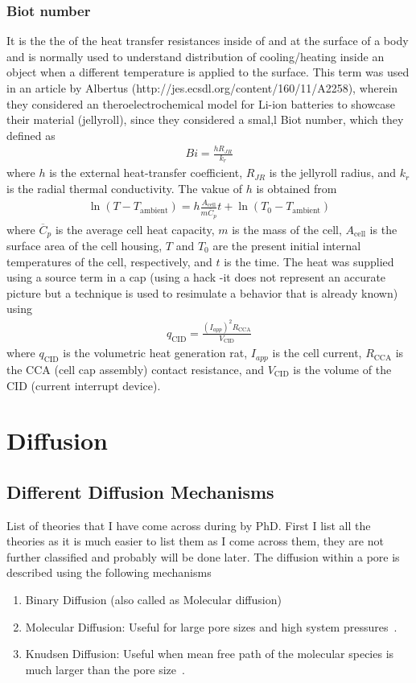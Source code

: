 \documentclass[12pt]{book}
\begin{document}
\subsection{Biot number} 
It is the the of the heat transfer resistances inside of and at the surface of a body and is normally used to understand distribution of cooling/heating inside an object when a different temperature is applied to the surface. This term was used in an article by Albertus (http://jes.ecsdl.org/content/160/11/A2258), wherein they considered an theroelectrochemical model for Li-ion batteries to showcase their material (jellyroll), since they considered a smal,l Biot number, which they defined as 
\begin{align}
Bi = \frac{hR_{JR}}{k_r}
\end{align}
where $h$ is the external heat-transfer coefficient, $R_{JR}$ is the jellyroll radius, and $k_r$ is the radial thermal conductivity. The vakue of $h$ is obtained from 
\begin{align}
\ln\left(T-T_\textrm{ambient}\right)=h\frac{A_\textrm{cell}}{m\overline{C}_p}t + \ln\left(T_0-T_\textrm{ambient}\right)
\end{align}
where $\overline{C}_p$ is the average cell heat capacity, $m$ is the mass of the cell, $A_\textrm{cell}$ is the surface area of the cell housing, $T$ and $T_0$ are the present initial internal temperatures of the cell, respectively, and $t$ is the time. The heat was supplied using a source term in a cap (using a hack -it does not represent an accurate picture but a technique is used to resimulate a behavior that is already known) using 
\begin{align}
q_\textrm{CID}=\frac{\left(I_{app}\right)^2R_\textrm{CCA}}{V_\textrm{CID}}
\end{align} where $q_\textrm{CID}$ is the volumetric heat generation rat, $I_{app}$ is the cell current, $R_\textrm{CCA}$ is the CCA (cell cap assembly) contact resistance, and $V_\textrm{CID}$ is the volume of the CID (current interrupt device).
\chapter{Diffusion}
\section{Different Diffusion Mechanisms}
List of theories that I have come across during by PhD. First I list all the theories as it is much easier to list them as I come across them, they are not further classified and probably will be done later.
The diffusion within a pore is described using the following mechanisms
\begin{enumerate}
	\item Binary Diffusion (also called as Molecular diffusion)
	\item Molecular Diffusion: Useful for large pore sizes and high system pressures~\cite{Suwanwarangkul2003}.
	\item Knudsen Diffusion: Useful when mean free path of the molecular species is much larger than the pore size~\cite{Suwanwarangkul2003}.
\end{enumerate}
\end{document}
